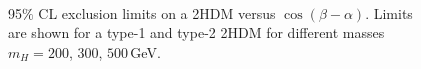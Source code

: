 \begin{figure}[htb]
{}
\\
\caption{95$\%$ CL exclusion limits on a 2HDM versus $\cos(\beta-\alpha)$. Limits are shown for a type-1 and type-2 2HDM for different masses $m_{H}=200$, $300$, $500\,$GeV.}
    \label{fig:2HDM1}
\end{figure}

